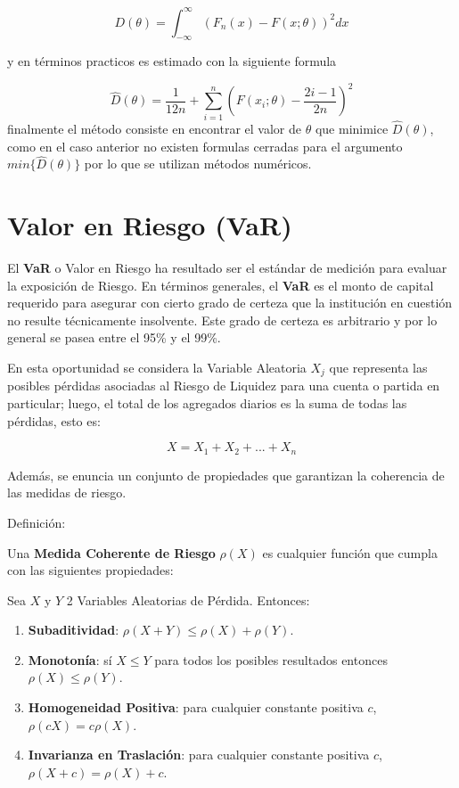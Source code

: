 \documentclass[]{article}
\providecommand{\tightlist}{%
  \setlength{\itemsep}{0pt}\setlength{\parskip}{0pt}}
\begin{document}
\[D(\theta)=\int_{-\infty}^{\infty}(F_n(x)-F(x;\theta))^2dx\]

y en términos practicos es estimado con la siguiente formula

\[\hat{D}(\theta)=\frac{1}{12n}+\sum_{i=1}^{n}\left(F(x_i ;\theta)-\frac{2i-1}{2n}\right)^2\]
finalmente el método consiste en encontrar el valor de \(\theta\) que
minimice \(\hat{D}(\theta)\), como en el caso anterior no existen
formulas cerradas para el argumento \(min\{\hat{D}(\theta)\}\) por lo
que se utilizan métodos numéricos.

\hypertarget{valor-en-riesgo-var}{%
\section{Valor en Riesgo (VaR)}\label{valor-en-riesgo-var}}

El \textbf{VaR} o Valor en Riesgo ha resultado ser el estándar de
medición para evaluar la exposición de Riesgo. En términos generales, el
\textbf{VaR} es el monto de capital requerido para asegurar con cierto
grado de certeza que la institución en cuestión no resulte técnicamente
insolvente. Este grado de certeza es arbitrario y por lo general se
pasea entre el 95\% y el 99\%.

En esta oportunidad se considera la Variable Aleatoria \(X_j\) que
representa las posibles pérdidas asociadas al Riesgo de Liquidez para
una cuenta o partida en particular; luego, el total de los agregados
diarios es la suma de todas las pérdidas, esto es:

\[X=X_1+X_2+...+X_n\]

Además, se enuncia un conjunto de propiedades que garantizan la
coherencia de las medidas de riesgo.

Definición:

Una \textbf{Medida Coherente de Riesgo} \(\rho(X)\) es cualquier función
que cumpla con las siguientes propiedades:

Sea \(X\) y \(Y\) 2 Variables Aleatorias de Pérdida. Entonces:

\begin{enumerate}
\def\labelenumi{\arabic{enumi})}
\tightlist
\item
  \textbf{Subaditividad}: \(\rho(X+Y) \leq \rho(X)+\rho(Y)\).\\
\item
  \textbf{Monotonía}: sí \(X \leq Y\) para todos los posibles resultados
  entonces \(\rho(X)\leq\rho(Y)\).\\
\item
  \textbf{Homogeneidad Positiva}: para cualquier constante positiva
  \(c\), \(\rho(cX)=c\rho(X)\).\\
\item
  \textbf{Invarianza en Traslación}: para cualquier constante positiva
  \(c\), \(\rho(X+c)=\rho(X)+c\).
\end{enumerate}
\end{document}
